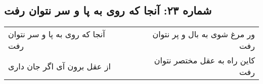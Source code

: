 \begin{center}
\section*{شماره ۲۳: آنجا که روی به پا و سر نتوان رفت}
\label{sec:023}
\begin{longtable}{l p{0.5cm} r}
آنجا که روی به پا و سر نتوان رفت
&&
ور مرغ شوی به بال و پر نتوان رفت
\\
از عقل برون آی اگر جان داری
&&
کاین راه به عقل مختصر نتوان رفت
\\
\end{longtable}
\end{center}
